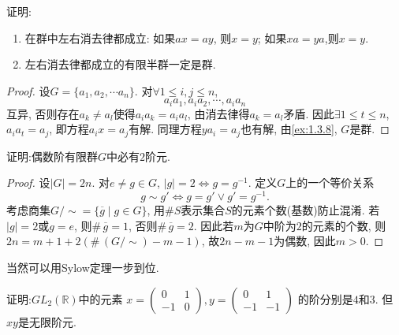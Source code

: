 \begin{problem}\label{ex:1.3.9}
    证明:
    \begin{enumerate}[(1)]
        \item 在群中左右消去律都成立: 如果$ax = ay$, 则$x = y$; 如果$xa = ya$,则$x = y$.
        \item 左右消去律都成立的有限半群一定是群.
    \end{enumerate}
\end{problem}

\begin{proof}
    设$G = \{a_1, a_2, \cdots a_n\}$. 对$\forall 1 \leqslant i, j \leqslant n$,
    \[
        a_ia_1, a_ia_2, \cdots, a_ia_n
    \]
    互异, 否则存在$a_k \neq a_l$使得$a_ia_k = a_ia_l$, 由消去律得$a_k = a_l$矛盾. 因此$\exists 1 \leqslant t \leqslant n$, $a_ia_t = a_j$, 即方程$a_ix = a_j$有解. 同理方程$ya_i = a_j$也有解, 由\ref{ex:1.3.8}, $G$是群.
\end{proof}

\begin{problem}
    证明:偶数阶有限群$G$中必有$2$阶元.
\end{problem}

\begin{proof}
    设$|G| = 2n$. 对$e \neq g \in G$, $|g| = 2 \iff g = g^{-1}$. 定义$G$上的一个等价关系
    \[
        g \sim g' \iff g = g' \lor g' = g^{-1}.
    \]
    考虑商集$G/\sim = \{\overline{g} \mid g \in G\}$, 用$\#S$表示集合$S$的元素个数(基数)防止混淆. 若$|g| = 2$或$g = e$, 则$\#\, \overline{g} = 1$, 否则$\#\, \overline{g} = 2$. 因此若$m$为$G$中阶为$2$的元素的个数, 则$2n = m + 1 + 2(\#\, (G/\sim) - m - 1)$, 故$2n - m - 1$为偶数, 因此$m > 0$.
\end{proof}

\begin{remark}
    当然可以用Sylow定理一步到位.
\end{remark}

\begin{problem}
    证明:$GL_2(\mathbb{R})$中的元素
    \(
        x = \begin{pmatrix}
            0 & 1\\
            -1 & 0
        \end{pmatrix},
        y = \begin{pmatrix}
            0 & 1\\
            -1 & -1
        \end{pmatrix}
    \)
    的阶分别是$4$和$3$. 但$xy$是无限阶元.
\end{problem}

